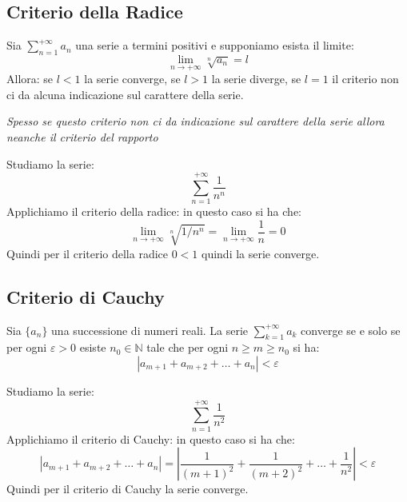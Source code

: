         \subsection{Criterio della Radice}
        \begin{definizione}
            Sia \emph{$\sum_{n=1}^{+\infty}a_n$} una serie a termini positivi e supponiamo esista il limite:
            \[ \lim_{n \to +\infty} \sqrt[n]{a_n} = l \]
            Allora: se $l < 1$ la serie converge, se $l > 1$ la serie diverge, se $l = 1$ il criterio non ci da alcuna indicazione sul carattere della serie.
        \end{definizione} 
        
    \emph{Spesso se questo criterio non ci da indicazione sul carattere della serie allora neanche il criterio del rapporto}


    \begin{esempio}
        Studiamo la serie:
            \[ \sum_{n=1}^{+\infty} \frac{1}{n^n} \]
        Applichiamo il criterio della radice:
        in questo caso si ha che:
        \begin{equation} \lim_{n \to +\infty} \sqrt[n]{1/n^n} = \lim_{n \to +\infty} \frac{1}{n} = 0
        \end{equation}
        Quindi per il criterio della radice $0<1$ quindi la serie converge.
            \end{esempio}
    \subsection{Criterio di Cauchy}
            \begin{definizione}
                    Sia $\{a_n\}$ una successione di numeri reali. La serie $\sum_{k=1}^{+\infty} a_k$ converge se e solo se per ogni $\varepsilon > 0$ esiste $n_0 \in \mathbb{N}$ tale che per ogni $n \geq m \geq n_0$ si ha:
                      \[ |a_{m+1} + a_{m+2} + \ldots + a_n| < \varepsilon \]
            \end{definizione}
    \begin{esempio}
        Studiamo la serie:
            \[ \sum_{n=1}^{+\infty} \frac{1}{n^2} \]
        Applichiamo il criterio di Cauchy:
        in questo caso si ha che:
        \begin{equation} |a_{m+1} + a_{m+2} + \ldots + a_n| = \left| \frac{1}{(m+1)^2} + \frac{1}{(m+2)^2} + \ldots + \frac{1}{n^2} \right| < \varepsilon
        \end{equation}
        Quindi per il criterio di Cauchy la serie converge.
    \end{esempio}